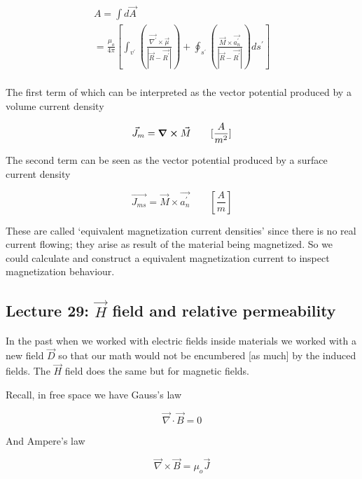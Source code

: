 \documentclass[10pt]{article}
\begin{document}
\begin{multline}
	A = \int d 	\vec{A} \\
	= \frac{\mu_o}{4\pi} \left[ \int_{v^\prime} \left( \frac{\vec{\nabla^\prime} \times \vec{\mu} }{|\vec{R} - \vec{R^\prime}|} \right)  + 
	\oint_{s^\prime} \left( \frac{\vec{M} \times  \vec{a_n^\prime}}{|\vec{R} - \vec{R^\prime}| } \right) ds^\prime \right] \\
\end{multline}

The first term of which can be interpreted as the vector potential produced by a volume current density 

\begin{equation}
	\vec{J}_m = \curl \vec{M} \qquad [\frac{A}{m^2}]
\end{equation}


The second term can be seen as the vector potential produced by a surface current density

\begin{equation}
	\vec{J_{ms}} = \vec{M} \times  \vec{a^\prime_n} \qquad [ \frac{A}{m} ]
\end{equation}


These are called `equivalent magnetization current densities' since there is no real current flowing; they arise as result of the material being magnetized. 
So we could calculate and construct a equivalent magnetization current to inspect magnetization behaviour.


\subsection{Lecture 29: \texorpdfstring{$\vec{H} $ }-field and relative permeability}
\begin{blockquote}
	In the past when we worked with electric fields inside materials we worked with a new field $ \vec{D} $ so that our math would not be encumbered [as much] by the induced fields. 
	The $ \vec{H} $ field does the same but for magnetic fields.
\end{blockquote}


Recall, in free space we have Gauss's law

\begin{equation}
	\vec{\nabla} \cdot  \vec{B} = 0
\end{equation}

And Ampere's law

\begin{equation}
	\vec{\nabla} \times  \vec{B} = \mu_o \vec{J}
\end{equation}
\end{document}
